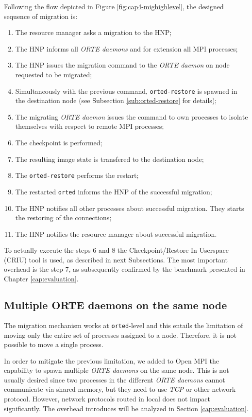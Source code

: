 Following the flow depicted in Figure \ref{fig:cap4-mighighlevel}, the designed
sequence of migration is:
\begin{enumerate}
\item The resource manager asks a migration to the HNP;
\item The HNP informs all \emph{ORTE daemons} and for extension all MPI processes;
\item The HNP issues the migration command to the \emph{ORTE daemon} on node
      requested to be migrated;
\item Simultaneously with the previous command, \texttt{orted-restore} is spawned in
      the destination node (see Subsection \ref{sub:orted-restore} for details);
\item The migrating \emph{ORTE daemon} issues the command to own processes to
      isolate themselves with respect to remote MPI processes;
\item The checkpoint is performed;
\item The resulting image state is transfered to the destination node;
\item The \texttt{orted-restore} performs the restart;
\item The restarted \texttt{orted} informs the HNP of the successful migration;
\item The HNP notifies all other processes about successful migration. They
      starts the restoring of the connections;
\item The HNP notifies the resource manager about successful migration.
\end{enumerate}

To actually execute the steps 6 and 8 the Checkpoint/Restore In Userspace
(CRIU) tool is used, as described in next Subsections. The most
important overhead is the step 7, as subsequently confirmed by the benchmark
presented in Chapter \ref{cap:evaluation}.

\subsection{Multiple ORTE daemons on the same node}
\label{subsec:multipleorted}
The migration mechanism works at \texttt{orted}-level and this entails the
limitation of moving only the entire set of processes assigned to a node.
Therefore, it is not possible to move a single process.

In order to mitigate the previous limitation, we added to Open MPI the
capability
to spawn multiple \emph{ORTE daemons} on the same node. This is not usually
desired since two processes in the different \emph{ORTE daemons} cannot
communicate via shared memory, but they need to use \emph{TCP} or other network
protocol. However, network protocols routed in local does not impact
significantly. The overhead introduces will be analyzed in Section
\ref{cap:evaluation}.

